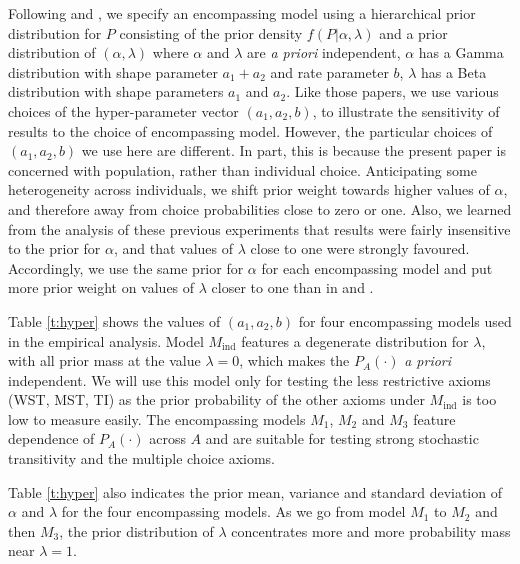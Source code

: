 \documentclass[11pt,letter]{article}
\begin{document}
Following  and , we specify an encompassing model using a hierarchical prior distribution for $P$ consisting of the prior density $f(P|\alpha,\lambda)$ and a prior distribution of $(\alpha,\lambda)$ where $\alpha$ and $\lambda$ are {\em a priori} independent, $\alpha$ has a Gamma distribution with shape parameter $a_1 + a_2$ and rate parameter $b$, $\lambda$ has a Beta distribution with shape parameters $a_1$ and $a_2$.
Like those papers, we use various choices of the hyper-parameter vector $(a_1,a_2,b)$, to illustrate the sensitivity of results to the choice of encompassing model.
However, the particular choices of $(a_1,a_2,b)$ we use here are different.
In part, this is because the present paper is concerned with population, rather than individual choice.
Anticipating some heterogeneity across individuals, we shift prior weight towards higher values of $\alpha$, and therefore away from choice probabilities close to zero or one.
Also, we learned from the analysis of these previous experiments that results were fairly insensitive to the prior for $\alpha$, and that values of $\lambda$ close to one were strongly favoured.
Accordingly, we use the same prior for $\alpha$ for each encompassing model and put more prior weight on values of $\lambda$ closer to one than in  and .

Table \ref{t:hyper} shows the values of $(a_1, a_2, b)$ for four encompassing models used in the empirical analysis.
Model $M_{\mathrm{ind}}$ features a degenerate distribution for $\lambda$, with all prior mass at the value $\lambda = 0$, which makes the $P_A(\cdot)$ {\em a priori} independent.
We will use this model only for testing the less restrictive axioms (WST, MST, TI) as the prior probability of the other axioms under $M_{\mathrm{ind}}$ is too low to measure easily.
The encompassing models $M_1$, $M_2$ and $M_3$ feature dependence of $P_A(\cdot)$ across $A$ and are suitable for testing strong stochastic transitivity and the multiple choice axioms.

Table \ref{t:hyper} also indicates the prior mean, variance and standard deviation of $\alpha$ and $\lambda$ for the four encompassing models.
As we go from model $M_1$ to $M_2$ and then $M_3$, the prior distribution of $\lambda$ concentrates more and more probability mass near $\lambda = 1$.
\end{document}

